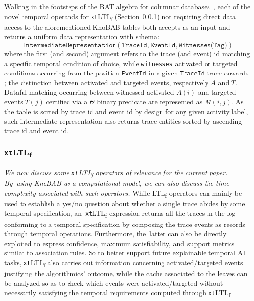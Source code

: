 \documentclass[information,article,accept,pdftex,oneauthor]{Definitions/mdpi}
\begin{document}
Walking in the footsteps of the BAT algebra for columnar databases~\cite{IdreosGNMMK12}, each of the novel temporal operands for \texttt{xt}LTL\textsubscript{f} (Section~\ref{xtltlf}) not requiring direct data access to the aforementioned KnoBAB tables both accepts as an input and returns a uniform data representation \added{$\rho$} with schema:
\begin{equation}\label{schema}
 \texttt{IntermediateRepresentation}(\texttt{TraceId},\texttt{EventId},\texttt{Witnesses(Tag)})
\end{equation}
 where the first (and second) argument refers to the trace (and event) id matching a specific temporal condition of choice, while \texttt{witnesses}  activated or targeted conditions occurring from the position \texttt{EventId} in a given \texttt{TraceId} trace onwards ;  the distinction between activated and targeted events, respectively $A$ and $T$. Dataful matching occurring between witnessed activated $A(i)$ and targeted events $T(j)$ certified via a $\Theta$ binary predicate are represented as $M(i,j)$. 
 As the table is sorted by trace id and event id by design for any given activity label, such intermediate representation  also returns  trace entities sorted by ascending trace id and event id.


\subsubsection{\texttt{xt}LTL\textsubscript{f}}\label{xtltlf}
\textit{We now discuss some \texttt{xt}LTL\textsubscript{f} operators of relevance for the current paper. By~using KnoBAB as a computational model, we can also discuss the time complexity associated with such operators.} While LTL\textsubscript{f} operators can mainly be used to establish a yes/no question about whether a single trace abides by some temporal specification, an~\texttt{xt}LTL\textsubscript{f} expression returns all the traces in the log conforming to a temporal specification by composing the trace events as records through temporal operations. Furthermore, the~latter can also be directly exploited to express confidence, maximum satisfiability, and~support metrics similar to association rules. So to better support future explainable temporal AI tasks, \texttt{xt}LTL\textsubscript{f} also carries out information concerning activated/targeted events justifying the algorithmics' outcome, while the cache associated to the leaves can be analyzed so as to check which events were activated/targeted without necessarily satisfying the temporal requirements computed through \texttt{xt}LTL\textsubscript{f}.
\end{document}
